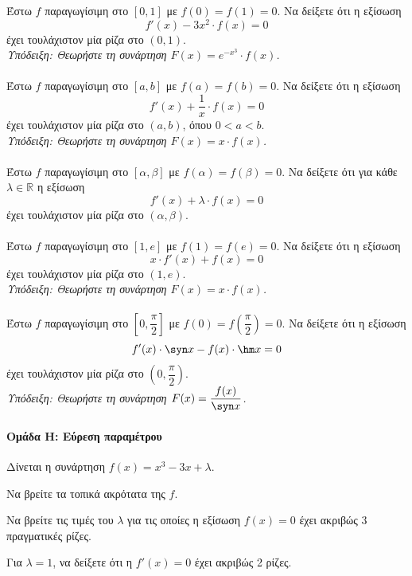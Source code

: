 \documentclass[11pt,a4paper,modern]{FFExercises}
\begin{document}
\askhsh
Έστω $f$ παραγωγίσιμη στο $[0, 1]$ με $f(0) = f(1) = 0$. Να δείξετε ότι η εξίσωση
\[
f'(x) - 3x^2 \cdot f(x) = 0
\]
έχει τουλάχιστον μία ρίζα στο $(0, 1)$.\\
\textit{Υπόδειξη: Θεωρήστε τη συνάρτηση $F(x) = e^{-x^3} \cdot f(x)$.}\\\\

\askhsh
Έστω $f$ παραγωγίσιμη στο $[a, b]$ με $f(a) = f(b) = 0$. Να δείξετε ότι η εξίσωση
\[
f'(x) + \frac{1}{x} \cdot f(x) = 0
\]
έχει τουλάχιστον μία ρίζα στο $(a, b)$, όπου $0 < a < b$.\\
\textit{Υπόδειξη: Θεωρήστε τη συνάρτηση $F(x) = x \cdot f(x)$.}\\\\

\askhsh
Έστω $f$ παραγωγίσιμη στο $[\alpha, \beta]$ με $f(\alpha) = f(\beta) = 0$. Να δείξετε ότι για κάθε $\lambda \in \mathbb{R}$ η εξίσωση
\[
f'(x) + \lambda \cdot f(x) = 0
\]
έχει τουλάχιστον μία ρίζα στο $(\alpha, \beta)$.\\\\

\askhsh
Έστω $f$ παραγωγίσιμη στο $[1, e]$ με $f(1) = f(e) = 0$. Να δείξετε ότι η εξίσωση
\[
x \cdot f'(x) + f(x) = 0
\]
έχει τουλάχιστον μία ρίζα στο $(1, e)$.\\
\textit{Υπόδειξη: Θεωρήστε τη συνάρτηση $F(x) = x \cdot f(x)$.}\\\\

\askhsh
Έστω $f$ παραγωγίσιμη στο $\left[0, \dfrac{\pi}{2}\right]$ με $f(0) = f\left(\dfrac{\pi}{2}\right) = 0$. Να δείξετε ότι η εξίσωση
\[
f'(x) \cdot \syn x - f(x) \cdot \hm x = 0
\]
έχει τουλάχιστον μία ρίζα στο $\left(0, \dfrac{\pi}{2}\right)$.\\
\textit{Υπόδειξη: Θεωρήστε τη συνάρτηση $F(x) = \dfrac{f(x)}{\syn x}$.}


\paragraph{Ομάδα Η: Εύρεση παραμέτρου}

\askhsh
Δίνεται η συνάρτηση $f(x) = x^3 - 3x + \lambda$.
\begin{alist}
  \item Να βρείτε τα τοπικά ακρότατα της $f$.
  \item Να βρείτε τις τιμές του $\lambda$ για τις οποίες η εξίσωση $f(x) = 0$ έχει ακριβώς 3 πραγματικές ρίζες.
  \item Για $\lambda = 1$, να δείξετε ότι η $f'(x) = 0$ έχει ακριβώς 2 ρίζες.
\end{alist}
\end{document}
